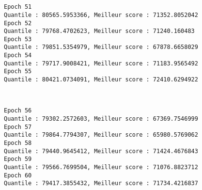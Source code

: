 \documentclass[11pt]{article}
\begin{document}
    \begin{center}
    \end{center}
    { \hspace*{\fill} \\}
    
    \begin{center}
    \end{center}
    { \hspace*{\fill} \\}
    
    \begin{Verbatim}[commandchars=\\\{\}]
Epoch 51
Quantile : 80565.5953366, Meilleur score : 71352.8052042
Epoch 52
Quantile : 79768.4702623, Meilleur score : 71240.160483
Epoch 53
Quantile : 79851.5354979, Meilleur score : 67878.6658029
Epoch 54
Quantile : 79717.9008421, Meilleur score : 71183.9565492
Epoch 55
Quantile : 80421.0734091, Meilleur score : 72410.6294922

    \end{Verbatim}

    \begin{center}
    \end{center}
    { \hspace*{\fill} \\}
    
    \begin{Verbatim}[commandchars=\\\{\}]
Epoch 56
Quantile : 79302.2572603, Meilleur score : 67369.7546999
Epoch 57
Quantile : 79864.7794307, Meilleur score : 65980.5769062
Epoch 58
Quantile : 79440.9645412, Meilleur score : 71424.4676843
Epoch 59
Quantile : 79566.7699504, Meilleur score : 71076.8823712
Epoch 60
Quantile : 79417.3855432, Meilleur score : 71734.4216837

    \end{Verbatim}

    \begin{center}
    \end{center}
    { \hspace*{\fill} \\}
    
    \begin{center}
    \end{center}
    { \hspace*{\fill} \\}
    
\end{document}
